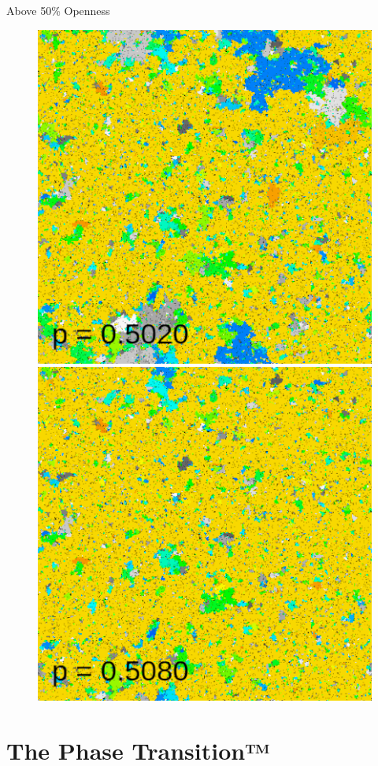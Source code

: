 \documentclass[aspectratio=169, handout]{beamer}
\begin{document}
\begin{frame}{Above 50\% Openness}
\begin{figure}
\includegraphics[scale=0.22]{percolation-gif/percolation-1-78.png}
\includegraphics[scale=0.22]{percolation-gif/percolation-1-90.png}
\end{figure}
\end{frame}

\section{The Phase Transition™}
\frame{\sectionpage}
\end{document}
